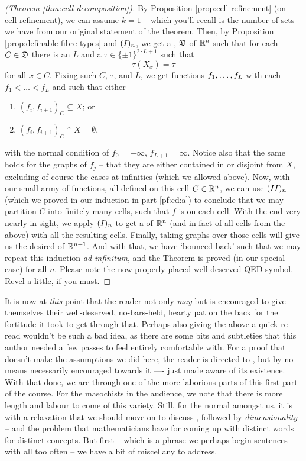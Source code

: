 \begin{proof}[\CD (Theorem \ref{thm:cell-decomposition})]
    By Proposition \ref{prop:cell-refinement} (on cell-refinement), we can assume $k = 1$ -- which you'll recall is the number of sets we have from our original statement of the theorem. Then, by Proposition \ref{prop:definable-fibre-types} and $(I)_{n}$, we get a \cd, $\mathfrak{D}$ of $\mathbb{R}^n$ such that for each $C \in \mathfrak{D}$ there is an $L$ and a $\tau \in \{\pm 1\}^{2 \cdot L + 1} $ such that
    $$
      \tau(X_x) = \tau
    $$
    for all $x \in C$. Fixing such $C$, $\tau$, and $L$, we get  functions $f_1, \hdots, f_{L}$ with each $f_1 < \hdots < f_L$ and such that either
    \begin{enumerate}
      \item $(f_i, f_{i+1})_C \subseteq X$; or
      \item $(f_i, f_{i+1})_C \cap X = \emptyset$,
    \end{enumerate}
    with the normal condition of $f_0 = - \infty$, $f_{L+1} = \infty$. Notice also that the same holds for the graphs of $f_j$ -- that they are either contained in or disjoint from $X$, excluding of course the cases at infinities (which we allowed above). Now, with our small army of  functions, all defined on this cell $C \in \mathbb{R}^n$, we can use $(II)_{n}$ (which we proved in our induction in part \ref{pf:cd:a}) to conclude that we may partition $C$ into finitely-many cells, such that $f$ is \cont on each cell. With the end very nearly in sight, we apply $(I)_{n}$ to get a \cd of $\mathbb{R}^n$ (and in fact of all cells from the above) \cmptble with all the resulting cells. Finally, taking graphs over those cells will give us the desired \cd of $\mathbb{R}^{n+1}$. And with that, we have `bounced back' such that we may repeat this induction \textit{ad infinitum}, and the \CD Theorem is proved (in our special case) for all $n$. Please note the now properly-placed well-deserved QED-symbol. Revel a little, if you must.
\end{proof}


It is now at \emph{this} point that the reader not only \emph{may} but is encouraged to give themselves their well-deserved, no-bars-held, hearty pat on the back for the fortitude it took to get through that. Perhaps also giving the above a quick re-read wouldn't be such a bad idea, as there are some bits and subtleties that this author needed a few passes to feel entirely comfortable with. For a proof that doesn't make the assumptions we did here, the reader is directed to \cite{knight_definable_1986}, but by no means necessarily encouraged towards it —- just made aware of its existence. With that done, we are through one of the more laborious parts of this first part of the course. For the masochists in the audience, we note that there is more length and labour to come of this variety. Still, for the normal amongst us, it is with a relaxation that we should move on to discuss \emph{}, followed by \emph{dimensionality} -- and the problem that mathematicians have for coming up with distinct words for distinct concepts. But first -- which is a phrase we perhaps begin sentences with all too often -- we have a bit of miscellany to address.
